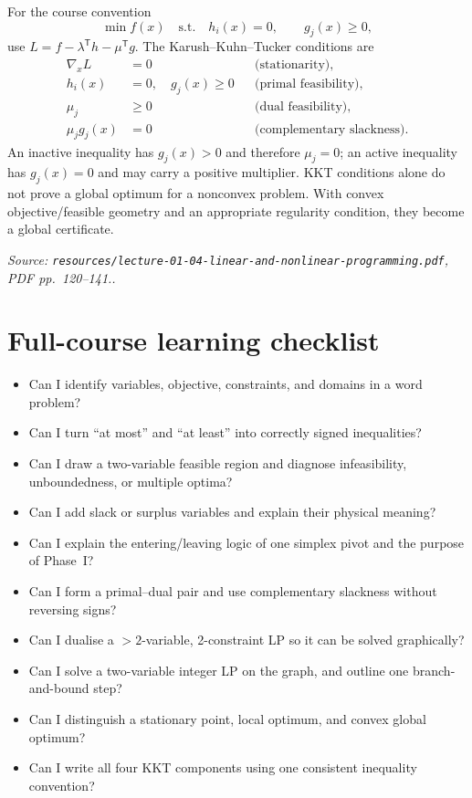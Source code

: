 \documentclass[11pt,a4paper]{article}
\renewcommand{\texttt}[1]{\nolinkurl{#1}}
\newcommand{\T}{\mathsf{T}}
\newcommand{\source}[1]{\par\smallskip\noindent\textit{Source: #1.}\par\smallskip}
\begin{document}
For the course convention
\[
 \min f(x)\quad\text{s.t.}\quad h_i(x)=0,\qquad g_j(x)\geq0,
\]
use $L=f-\lambda^\T h-\mu^\T g$. The Karush--Kuhn--Tucker conditions are
\begin{align*}
 \nabla_xL&=0 &&\text{(stationarity)},\\
 h_i(x)&=0,\quad g_j(x)\geq0 &&\text{(primal feasibility)},\\
 \mu_j&\geq0 &&\text{(dual feasibility)},\\
 \mu_jg_j(x)&=0 &&\text{(complementary slackness)}.
\end{align*}
An inactive inequality has $g_j(x)>0$ and therefore $\mu_j=0$; an active inequality has $g_j(x)=0$ and may carry a positive multiplier. KKT conditions alone do not prove a global optimum for a nonconvex problem. With convex objective/feasible geometry and an appropriate regularity condition, they become a global certificate.
\source{\texttt{resources/lecture-01-04-linear-and-nonlinear-programming.pdf}, PDF pp.~120--141.}

\section{Full-course learning checklist}
\begin{itemize}
\item Can I identify variables, objective, constraints, and domains in a word problem?
\item Can I turn ``at most'' and ``at least'' into correctly signed inequalities?
\item Can I draw a two-variable feasible region and diagnose infeasibility, unboundedness, or multiple optima?
\item Can I add slack or surplus variables and explain their physical meaning?
\item Can I explain the entering/leaving logic of one simplex pivot and the purpose of Phase~I?
\item Can I form a primal--dual pair and use complementary slackness without reversing signs?
\item Can I dualise a $>2$-variable, 2-constraint LP so it can be solved graphically?
\item Can I solve a two-variable integer LP on the graph, and outline one branch-and-bound step?
\item Can I distinguish a stationary point, local optimum, and convex global optimum?
\item Can I write all four KKT components using one consistent inequality convention?
\end{itemize}
\end{document}
